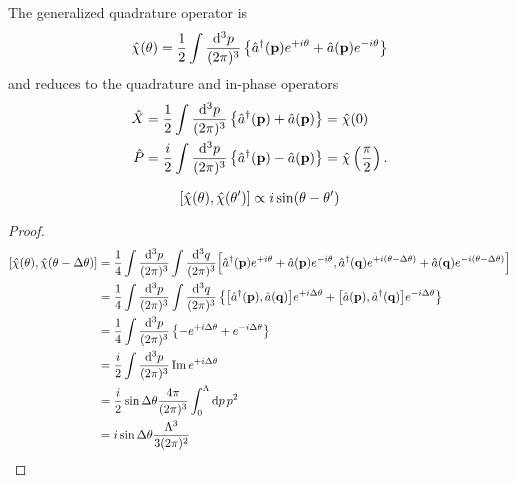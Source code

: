 \begin{definition}
	The generalized quadrature operator is
	\begin{equation}
		\hat\chi(\theta)
		=
		\frac{1}{2}
		\int\frac{\dd[3]{p}}{(2\pi)^3}
		\left\{
			\hat{a}^\dagger(\vb{p})
			e^{+i\theta}
			+
			\hat{a}(\vb{p})
			e^{-i\theta}
		\right\}
	\end{equation}
	and reduces to the quadrature and in-phase operators
	\begin{align}
		\hat{X}
		&=
		\frac{1}{2}
		\int\frac{\dd[3]{p}}{(2\pi)^3}
		\left\{
			\hat{a}^\dagger(\vb{p})
			+
			\hat{a}(\vb{p})
		\right\}
		=
		\hat\chi(0)
		\\
		\hat{P}
		&=
		\frac{i}{2}
		\int\frac{\dd[3]{p}}{(2\pi)^3}
		\left\{
			\hat{a}^\dagger(\vb{p})
			-
			\hat{a}(\vb{p})
		\right\}
		=
		\hat\chi\left(\frac{\pi}{2}\right)
		.
	\end{align}
\end{definition}
\begin{lemma}
	\begin{equation}
		\comm{\hat\chi(\theta)}{\hat\chi(\theta^\prime)}
		\propto
		i\sin(\theta-\theta^\prime)
	\end{equation}
\end{lemma}
\begin{proof}
	\begin{equation*}
		\begin{split}
			\comm{\hat\chi(\theta)}{\hat\chi(\theta-\Delta\theta)}
			&=
			\frac{1}{4}
			\int\frac{\dd[3]{p}}{(2\pi)^3}
			\int\frac{\dd[3]{q}}{(2\pi)^3}
			\comm{
				\hat{a}^\dagger(\vb{p})
				e^{+i\theta}
				+
				\hat{a}(\vb{p})
				e^{-i\theta}
			}{
				\hat{a}^\dagger(\vb{q})
				e^{+i(\theta-\Delta\theta)}
				+
				\hat{a}(\vb{q})
				e^{-i(\theta-\Delta\theta)}
			}
			\\
			&=
			\frac{1}{4}
			\int\frac{\dd[3]{p}}{(2\pi)^3}
			\int\frac{\dd[3]{q}}{(2\pi)^3}
			\left\{
				\comm{\hat{a}^\dagger(\vb{p})}{\hat{a}(\vb{q})}
				e^{+i\Delta\theta}
				+
				\comm{\hat{a}(\vb{p})}{\hat{a}^\dagger(\vb{q})}
				e^{-i\Delta\theta}
			\right\}
			\\
			&=
			\frac{1}{4}
			\int\frac{\dd[3]{p}}{(2\pi)^3}
			\left\{
				-
				e^{+i\Delta\theta}
				+
				e^{-i\Delta\theta}
			\right\}
			\\
			&=
			\frac{i}{2}
			\int\frac{\dd[3]{p}}{(2\pi)^3}
			\Im e^{+i\Delta\theta}
			\\
			&=
			\frac{i}{2}
			\sin\Delta\theta
			\frac{4\pi}{(2\pi)^3}
			\int_0^\Lambda \dd{p}p^2
			\\
			&=
			i
			\sin\Delta\theta
			\frac{\Lambda^3}{3(2\pi)^2}
		\end{split}
	\end{equation*}
\end{proof}